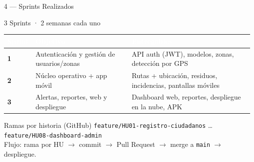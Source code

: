 \documentclass[aspectratio=169, 11pt]{beamer}
\begin{document}
\begin{frame}{4 — Sprints Realizados}
    \vspace{-0.2cm}
    \begin{block}{3 Sprints · 2 semanas cada uno}
        \footnotesize
        \begin{table}
        \scriptsize
        \begin{tabular}{|l|p{4.2cm}|p{4.8cm}|}
        \hline
        \rowcolor{azulin}
        \textcolor{white}{\textbf{Sprint}} & \textcolor{white}{\textbf{Objetivo}} & \textcolor{white}{\textbf{Entregables}}\\
        \hline
        \textbf{1} & Autenticación y gestión de usuarios/zonas & API auth (JWT), modelos, zonas, detección por GPS \\
        \hline
        \textbf{2} & Núcleo operativo + app móvil & Rutas + ubicación, residuos, incidencias, pantallas móviles \\
        \hline
        \textbf{3} & Alertas, reportes, web y despliegue & Dashboard web, reportes, despliegue en la nube, APK \\
        \hline
        \end{tabular}
        \end{table}
    \end{block}
    \begin{block}{Ramas por historia (GitHub)}
        \scriptsize
        \texttt{feature/HU01-registro-ciudadanos} \dots \texttt{feature/HU08-dashboard-admin}\\
        Flujo: rama por HU $\rightarrow$ commit $\rightarrow$ Pull Request $\rightarrow$ merge a \texttt{main} $\rightarrow$ despliegue.
    \end{block}
\end{frame}
\end{document}
